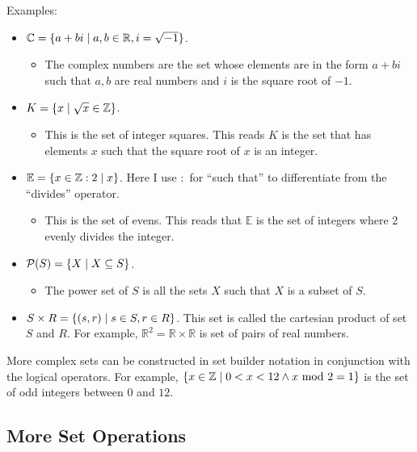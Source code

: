 Examples: 
\begin{itemize}
    \item \(\mathbb{C}=\{a+bi\mid a,b\in\mathbb{R},i=\sqrt{-1}\}\). 
    \begin{itemize}
        \item The complex numbers are the set whose elements are in the form \(a+bi\) such that \(a,b\) are real numbers and \(i\) is the square root of \(-1\).
    \end{itemize}
    \item \(K=\{x\mid\sqrt{x}\in\mathbb{Z}\}\). 
    \begin{itemize}
        \item This is the set of integer squares. This reads \(K\) is the set that has elements \(x\) such that the square root of \(x\) is an integer. 
    \end{itemize}
    \item \(\mathbb{E}=\{x\in\mathbb{Z}:2\mid x\}\). Here I use \(:\) for ``such that'' to differentiate from the ``divides'' operator. 
    \begin{itemize}
        \item This is the set of evens. This reads that \(\mathbb{E}\) is the set of integers where \(2\) evenly divides the integer.
    \end{itemize}
    \item \(\mathcal{P}(S)=\{X\mid X\subseteq S\}\). 
    \begin{itemize}
        \item The power set of \(S\) is all the sets \(X\) such that \(X\) is a subset of \(S\).
    \end{itemize}
    \item \(S\times R=\{(s,r)\mid s\in S,r\in R\}\). This set is called the cartesian product of set \(S\) and \(R\). For example, \(\mathbb{R}^2=\mathbb{R}\times\mathbb{R}\) 
    is set of pairs of real numbers. 
\end{itemize}

More complex sets can be constructed in set builder notation in conjunction with the logical operators. For example, \(\{x\in\mathbb{Z}\mid0<x<12\land x\text{ mod } 2=1\}\) is the 
set of odd integers between \(0\) and \(12\).

\subsection{More Set Operations}


